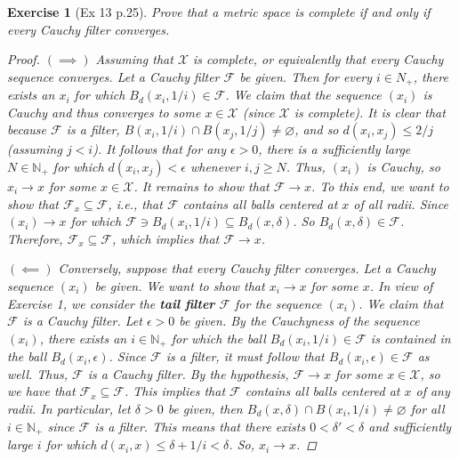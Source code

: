 \documentclass[11pt]{article}
\newtheorem{exercise}{Exercise}
\newcommand{\N}{\mathbb{N}}
\newcommand{\F}{\mathcal{F}}
\newcommand{\X}{\mathcal{X}}
\begin{document}
\begin{exercise}[Ex 13 p.25]
	Prove that a metric space is complete if and only if every Cauchy filter converges.
	\begin{proof}
		$(\implies)$ Assuming that $\X$ is complete, or equivalently that every Cauchy sequence converges. Let a Cauchy filter $\F$ be given. Then for every $i\in N_+$, there exists an $ x_i$ for which $B_d(x_i,1/i)\in \F$. We claim that the sequence $(x_i)$ is Cauchy and thus converges to some $x\in \X$ (since $\X$ is complete). It is clear that because $\F$ is a filter, $B(x_i, 1/i) \cap B(x_j,1/j) \neq \varnothing$, and so $d(x_i, x_j) \leq 2/j$ (assuming $j < i$). It follows that for any $\epsilon > 0$, there is a sufficiently large $N\in \N_+$ for which $d(x_i,x_j) < \epsilon$ whenever $i,j \geq N$. Thus, $(x_i)$ is Cauchy, so $x_i \to x$ for some $x\in \X$. It remains to show that $\F \to x$. To this end, we want to show that $\F_x \subseteq \F$, i.e., that $\F$ contains all balls centered at $x$ of all radii. Since $(x_i) \to x$ for which $\F \ni B_d(x_i,1/i) \subseteq B_d(x,\delta)$. So $B_d(x,\delta)\in \F$. Therefore, $\F_x \subseteq  \F$, which implies that $\F\to x$.   	
		
		$(\impliedby)$ Conversely, suppose that every Cauchy filter converges. Let a Cauchy sequence $(x_i)$ be given. We want to show that $x_i\to x$ for some $x$. In view of Exercise 1, we consider the \textbf{tail filter} $\F$ for the sequence $(x_i)$. We claim that $\F$ is a Cauchy filter. Let $\epsilon > 0$ be given. By the Cauchyness of the sequence $(x_i)$, there exists an $i\in \N_+$ for which the ball $B_d(x_i,1/i) \in \F$ is contained in the ball $B_d(x_i,\epsilon)$. Since $\F$ is a filter, it must follow that $B_d(x_i,\epsilon) \in \F$ as well. Thus, $\F$ is a Cauchy filter. By the hypothesis, $\F \to x$ for some $x\in \X$, so we have that $\F_x\subseteq \F$. This implies that $\F$ contains all balls centered at $x$ of any radii. In particular, let $\delta > 0$ be given, then $B_d(x,\delta)\cap B(x_i,1/i) \neq \varnothing$ for all $i\in \N_+$ since $\F$ is a filter. This means that there exists $0 < \delta' < \delta$ and sufficiently large $i$ for which $d(x_i,x) \leq \delta+ 1/i < \delta$. So, $x_i \to x$.  
 	\end{proof}
\end{exercise}
\end{document}
